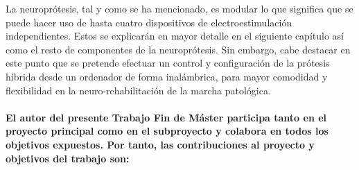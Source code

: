 La neuroprótesis, tal y como se ha mencionado, es modular lo que significa que se puede hacer uso de hasta cuatro dispositivos de electroestimulación independientes. Estos se explicarán en mayor detalle en el siguiente capítulo así como el resto de componentes de la neuroprótesis. Sin embargo, cabe destacar en este punto que se pretende efectuar un control y configuración de la prótesis híbrida desde un ordenador de forma inalámbrica, para mayor comodidad y flexibilidad en la neuro-rehabilitación de la marcha patológica. 
\\
\\
\textbf{El autor del presente Trabajo Fin de Máster participa tanto en el proyecto principal como en el subproyecto y colabora en todos los objetivos expuestos. Por tanto, las contribuciones al proyecto y objetivos del trabajo son:}

